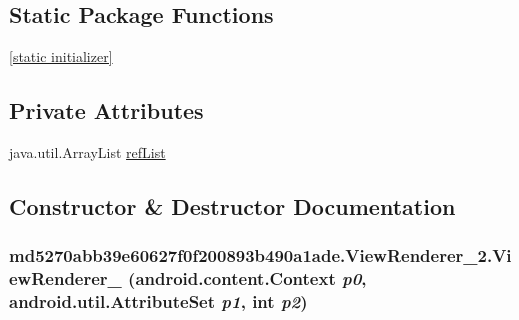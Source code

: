 \subsection*{Static Package Functions}
\begin{CompactItemize}
\item 
\hyperlink{classmd5270abb39e60627f0f200893b490a1ade_1_1_view_renderer__2_30528b2f26688d4ae24a58b2a1865a93}{\mbox{[}static initializer\mbox{]}}
\end{CompactItemize}
\subsection*{Private Attributes}
\begin{CompactItemize}
\item 
java.util.ArrayList \hyperlink{classmd5270abb39e60627f0f200893b490a1ade_1_1_view_renderer__2_489e61f24650a22849fddacb3f498a6b}{refList}
\end{CompactItemize}


\subsection{Constructor \& Destructor Documentation}
\hypertarget{classmd5270abb39e60627f0f200893b490a1ade_1_1_view_renderer__2_34f641fdb772410dc88ca2ac5c3fb492}{
\subsubsection[{ViewRenderer\_\-2}]{\setlength{\rightskip}{0pt plus 5cm}md5270abb39e60627f0f200893b490a1ade.ViewRenderer\_\-2.ViewRenderer\_ (android.content.Context {\em p0}, \/  android.util.AttributeSet {\em p1}, \/  int {\em p2})}}
\label{classmd5270abb39e60627f0f200893b490a1ade_1_1_view_renderer__2_34f641fdb772410dc88ca2ac5c3fb492}




